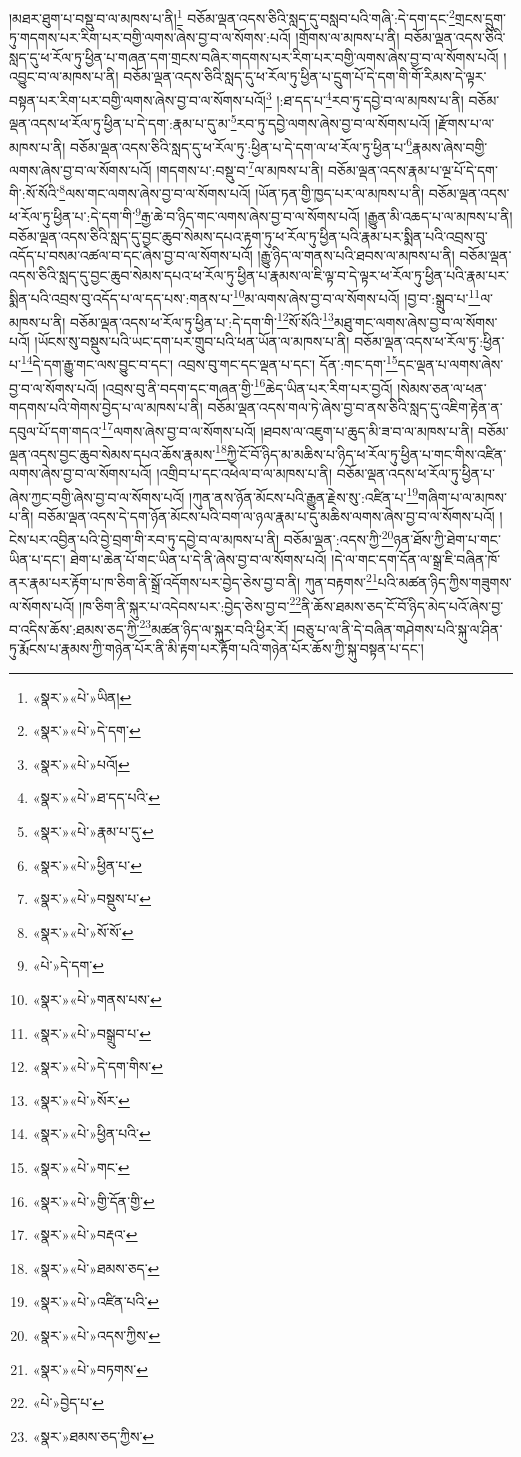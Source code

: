 །མཐར་ཐུག་པ་བསྡུ་བ་ལ་མཁས་པ་ནི།\footnote{«སྣར་»«པེ་»ཡིན།} བཅོམ་ལྡན་འདས་ཅིའི་སླད་དུ་བསླབ་པའི་གཞི་:དེ་དག་དང་\footnote{«སྣར་»«པེ་»དེ་དག་}གྲངས་དྲུག་ཏུ་གདགས་པར་རིག་པར་བགྱི་ལགས་ཞེས་བྱ་བ་ལ་སོགས་:པའོ། །གྲོགས་ལ་མཁས་པ་ནི། བཅོམ་ལྡན་འདས་ཅིའི་སླད་དུ་ཕ་རོལ་ཏུ་ཕྱིན་པ་གཞན་དག་གྲངས་བཞིར་གདགས་པར་རིག་པར་བགྱི་ལགས་ཞེས་བྱ་བ་ལ་སོགས་པའོ། །འབྱུང་བ་ལ་མཁས་པ་ནི། བཅོམ་ལྡན་འདས་ཅིའི་སླད་དུ་ཕ་རོལ་ཏུ་ཕྱིན་པ་དྲུག་པོ་དེ་དག་གི་གོ་རིམས་དེ་ལྟར་བསྟན་པར་རིག་པར་བགྱི་ལགས་ཞེས་བྱ་བ་ལ་སོགས་པའོ།\footnote{«སྣར་»«པེ་»པའོ།} །:ཐ་དད་པ་\footnote{«སྣར་»«པེ་»ཐ་དད་པའི་}རབ་ཏུ་དབྱེ་བ་ལ་མཁས་པ་ནི། བཅོམ་ལྡན་འདས་ཕ་རོལ་ཏུ་ཕྱིན་པ་དེ་དག་:རྣམ་པ་དུ་མ་\footnote{«སྣར་»«པེ་»རྣམ་པ་དུ་}རབ་ཏུ་དབྱེ་ལགས་ཞེས་བྱ་བ་ལ་སོགས་པའོ། །རྫོགས་པ་ལ་མཁས་པ་ནི། བཅོམ་ལྡན་འདས་ཅིའི་སླད་དུ་ཕ་རོལ་ཏུ་:ཕྱིན་པ་དེ་དག་ལ་ཕ་རོལ་ཏུ་ཕྱིན་པ་\footnote{«སྣར་»«པེ་»ཕྱིན་པ་}རྣམས་ཞེས་བགྱི་ལགས་ཞེས་བྱ་བ་ལ་སོགས་པའོ། །གདགས་པ་:བསྡུ་བ་\footnote{«སྣར་»«པེ་»བསྡུས་པ་}ལ་མཁས་པ་ནི། བཅོམ་ལྡན་འདས་རྣམ་པ་ལྔ་པོ་དེ་དག་གི་:སོ་སོའི་\footnote{«སྣར་»«པེ་»སོ་སོ་}ལས་གང་ལགས་ཞེས་བྱ་བ་ལ་སོགས་པའོ། །ཡོན་ཏན་གྱི་ཁྱད་པར་ལ་མཁས་པ་ནི། བཅོམ་ལྡན་འདས་ཕ་རོལ་ཏུ་ཕྱིན་པ་:དེ་དག་གི་\footnote{«པེ་»དེ་དག་}རྒྱ་ཆེ་བ་ཉིད་གང་ལགས་ཞེས་བྱ་བ་ལ་སོགས་པའོ། །རྒྱུན་མི་འཆད་པ་ལ་མཁས་པ་ནི། བཅོམ་ལྡན་འདས་ཅིའི་སླད་དུ་བྱང་ཆུབ་སེམས་དཔའ་རྟག་ཏུ་ཕ་རོལ་ཏུ་ཕྱིན་པའི་རྣམ་པར་སྨིན་པའི་འབྲས་བུ་འདོད་པ་བསམ་འཚལ་བ་དང་ཞེས་བྱ་བ་ལ་སོགས་པའོ། །རྒྱུ་ཉིད་ལ་གནས་པའི་ཐབས་ལ་མཁས་པ་ནི། བཅོམ་ལྡན་འདས་ཅིའི་སླད་དུ་བྱང་ཆུབ་སེམས་དཔའ་ཕ་རོལ་ཏུ་ཕྱིན་པ་རྣམས་ལ་ཇི་ལྟ་བ་དེ་ལྟར་ཕ་རོལ་ཏུ་ཕྱིན་པའི་རྣམ་པར་སྨིན་པའི་འབྲས་བུ་འདོད་པ་ལ་དད་པས་:གནས་པ་\footnote{«སྣར་»«པེ་»གནས་པས་}མ་ལགས་ཞེས་བྱ་བ་ལ་སོགས་པའོ། །བྱ་བ་:སྒྲུབ་པ་\footnote{«སྣར་»«པེ་»བསྒྲུབ་པ་}ལ་མཁས་པ་ནི། བཅོམ་ལྡན་འདས་ཕ་རོལ་ཏུ་ཕྱིན་པ་:དེ་དག་གི་\footnote{«སྣར་»«པེ་»དེ་དག་གིས་}སོ་སོའི་\footnote{«སྣར་»«པེ་»སོར་}མཐུ་གང་ལགས་ཞེས་བྱ་བ་ལ་སོགས་པའོ། །ཡོངས་སུ་བསྡུས་པའི་ཡང་དག་པར་གྲུབ་པའི་ཕན་ཡོན་ལ་མཁས་པ་ནི། བཅོམ་ལྡན་འདས་ཕ་རོལ་ཏུ་:ཕྱིན་པ་\footnote{«སྣར་»«པེ་»ཕྱིན་པའི་}དེ་དག་རྒྱུ་གང་ལས་བྱུང་བ་དང་། འབྲས་བུ་གང་དང་ལྡན་པ་དང་། དོན་:གང་དག་\footnote{«སྣར་»«པེ་»གང་}དང་ལྡན་པ་ལགས་ཞེས་བྱ་བ་ལ་སོགས་པའོ། །འབྲས་བུ་ནི་བདག་དང་གཞན་གྱི་\footnote{«སྣར་»«པེ་»གྱི་དོན་གྱི་}ཆེད་ཡིན་པར་རིག་པར་བྱའོ། །སེམས་ཅན་ལ་ཕན་གདགས་པའི་གེགས་བྱེད་པ་ལ་མཁས་པ་ནི། བཅོམ་ལྡན་འདས་གལ་ཏེ་ཞེས་བྱ་བ་ནས་ཅིའི་སླད་དུ་འཇིག་རྟེན་ན་དབུལ་པོ་དག་གདའ་\footnote{«སྣར་»«པེ་»བརྡའ་}ལགས་ཞེས་བྱ་བ་ལ་སོགས་པའོ། །ཐབས་ལ་འཇུག་པ་ཆུད་མི་ཟ་བ་ལ་མཁས་པ་ནི། བཅོམ་ལྡན་འདས་བྱང་ཆུབ་སེམས་དཔའ་ཆོས་རྣམས་\footnote{«སྣར་»«པེ་»ཐམས་ཅད་}ཀྱི་ངོ་བོ་ཉིད་མ་མཆིས་པ་ཉིད་ཕ་རོལ་ཏུ་ཕྱིན་པ་གང་གིས་འཛིན་ལགས་ཞེས་བྱ་བ་ལ་སོགས་པའོ། །འགྲིབ་པ་དང་འཕེལ་བ་ལ་མཁས་པ་ནི། བཅོམ་ལྡན་འདས་ཕ་རོལ་ཏུ་ཕྱིན་པ་ཞེས་ཀྱང་བགྱི་ཞེས་བྱ་བ་ལ་སོགས་པའོ། །ཀུན་ནས་ཉོན་མོངས་པའི་རྒྱུན་རྗེས་སུ་:འཛིན་པ་\footnote{«སྣར་»«པེ་»འཛིན་པའི་}གཞིག་པ་ལ་མཁས་པ་ནི། བཅོམ་ལྡན་འདས་དེ་དག་ཉོན་མོངས་པའི་བག་ལ་ཉལ་རྣམ་པ་དུ་མཆིས་ལགས་ཞེས་བྱ་བ་ལ་སོགས་པའོ། །ངེས་པར་འབྱིན་པའི་བྱེ་བྲག་གི་རབ་ཏུ་དབྱེ་བ་ལ་མཁས་པ་ནི། བཅོམ་ལྡན་:འདས་ཀྱི་\footnote{«སྣར་»«པེ་»འདས་ཀྱིས་}ཉན་ཐོས་ཀྱི་ཐེག་པ་གང་ཡིན་པ་དང་། ཐེག་པ་ཆེན་པོ་གང་ཡིན་པ་དེ་ནི་ཞེས་བྱ་བ་ལ་སོགས་པའོ། །དེ་ལ་གང་དག་དོན་ལ་སྒྲ་ཇི་བཞིན་ཁོ་ནར་རྣམ་པར་རྟོག་པ་ཁ་ཅིག་ནི་སྒྲོ་འདོགས་པར་བྱེད་ཅེས་བྱ་བ་ནི། ཀུན་བརྟགས་\footnote{«སྣར་»«པེ་»བཏགས་}པའི་མཚན་ཉིད་ཀྱིས་གཟུགས་ལ་སོགས་པའོ། །ཁ་ཅིག་ནི་སྐུར་པ་འདེབས་པར་:བྱེད་ཅེས་བྱ་བ་\footnote{«པེ་»བྱེད་པ་}ནི་ཆོས་ཐམས་ཅད་ངོ་བོ་ཉིད་མེད་པའོ་ཞེས་བྱ་བ་འདིས་ཆོས་:ཐམས་ཅད་ཀྱི་\footnote{«སྣར་»ཐམས་ཅད་ཀྱིས་}མཚན་ཉིད་ལ་སྐུར་བའི་ཕྱིར་རོ། །བཅུ་པ་ལ་ནི་དེ་བཞིན་གཤེགས་པའི་སྐུ་ལ་ཤིན་ཏུ་རྨོངས་པ་རྣམས་ཀྱི་གཉེན་པོར་ནི་མི་རྟག་པར་རྟོག་པའི་གཉེན་པོར་ཆོས་ཀྱི་སྐུ་བསྟན་པ་དང་། 